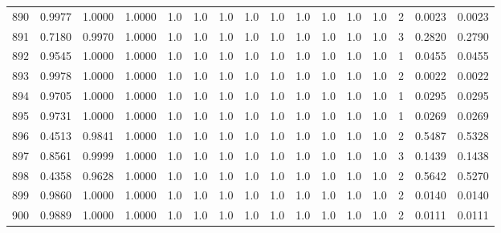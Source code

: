 \begin{tabular}{lrrrrrrrrrrrrrrr}
890 &      0.9977 &  1.0000 &  1.0000 &     1.0 &     1.0 &     1.0 &     1.0 &     1.0 &     1.0 &     1.0 &      1.0 &        1.0 &      2 &                    0.0023 &                     0.0023 \\
891 &      0.7180 &  0.9970 &  1.0000 &     1.0 &     1.0 &     1.0 &     1.0 &     1.0 &     1.0 &     1.0 &      1.0 &        1.0 &      3 &                    0.2820 &                     0.2790 \\
892 &      0.9545 &  1.0000 &  1.0000 &     1.0 &     1.0 &     1.0 &     1.0 &     1.0 &     1.0 &     1.0 &      1.0 &        1.0 &      1 &                    0.0455 &                     0.0455 \\
893 &      0.9978 &  1.0000 &  1.0000 &     1.0 &     1.0 &     1.0 &     1.0 &     1.0 &     1.0 &     1.0 &      1.0 &        1.0 &      2 &                    0.0022 &                     0.0022 \\
894 &      0.9705 &  1.0000 &  1.0000 &     1.0 &     1.0 &     1.0 &     1.0 &     1.0 &     1.0 &     1.0 &      1.0 &        1.0 &      1 &                    0.0295 &                     0.0295 \\
895 &      0.9731 &  1.0000 &  1.0000 &     1.0 &     1.0 &     1.0 &     1.0 &     1.0 &     1.0 &     1.0 &      1.0 &        1.0 &      1 &                    0.0269 &                     0.0269 \\
896 &      0.4513 &  0.9841 &  1.0000 &     1.0 &     1.0 &     1.0 &     1.0 &     1.0 &     1.0 &     1.0 &      1.0 &        1.0 &      2 &                    0.5487 &                     0.5328 \\
897 &      0.8561 &  0.9999 &  1.0000 &     1.0 &     1.0 &     1.0 &     1.0 &     1.0 &     1.0 &     1.0 &      1.0 &        1.0 &      3 &                    0.1439 &                     0.1438 \\
898 &      0.4358 &  0.9628 &  1.0000 &     1.0 &     1.0 &     1.0 &     1.0 &     1.0 &     1.0 &     1.0 &      1.0 &        1.0 &      2 &                    0.5642 &                     0.5270 \\
899 &      0.9860 &  1.0000 &  1.0000 &     1.0 &     1.0 &     1.0 &     1.0 &     1.0 &     1.0 &     1.0 &      1.0 &        1.0 &      2 &                    0.0140 &                     0.0140 \\
900 &      0.9889 &  1.0000 &  1.0000 &     1.0 &     1.0 &     1.0 &     1.0 &     1.0 &     1.0 &     1.0 &      1.0 &        1.0 &      2 &                    0.0111 &                     0.0111 \\

\end{tabular}
